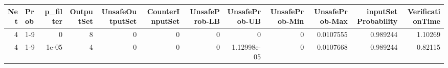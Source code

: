 \begin{tabular}{rlrrrrrrrrrr}
\hline
   Net & Prob   &   p\_filter &   OutputSet &   UnsafeOutputSet &   CounterInputSet &   UnsafeProb-LB &   UnsafeProb-UB &   UnsafeProb-Min &   UnsafeProb-Max &   inputSet Probability &   VerificationTime \\
\hline
     4 & 1-9    &      0     &           8 &                 0 &                 0 &               0 &     0           &                0 &        0.0107555 &               0.989244 &            1.10269 \\
     4 & 1-9    &      1e-05 &           4 &                 0 &                 0 &               0 &     1.12998e-05 &                0 &        0.0107668 &               0.989244 &            0.82115 \\
\hline
\end{tabular}
